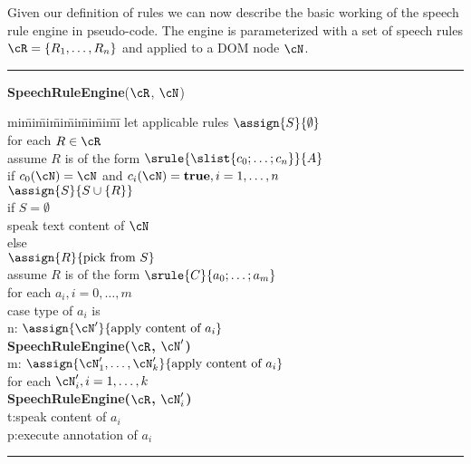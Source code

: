 \documentclass{sig-alternate}
\begin{document}
Given our definition of rules we can now describe the basic working of the
speech rule engine in pseudo-code. The engine is parameterized with a set of
speech rules ${\cR}={\{R_1,\ldots,R_n\}}$ and applied to a DOM node $\cN$.

\vspace{.3cm}\hrule\vspace{.2cm}
\noindent \textbf{SpeechRuleEngine}($\cR$, $\cN$)
\vspace{-.2cm}\begin{ntabbing}
  mi\=mi\=mi\=mi\=mi\=mi\=mi\=mi\=\kill
  let applicable rules $\assign{S}{\emptyset}$\label{}\\
  for each $R\in \cR$\label{}\\
  \> assume $R$ is of the form $\srule{\slist{c_0;\ldots;c_n}}{A}$\label{}\\
  \> if $c_0(\cN) = \cN$ and $c_i(\cN) = \mathbf{true}, i=1,\ldots,n$\label{}\\
  \>\> $\assign{S}{S\cup\{R\}}$\label{}\\
  if $S=\emptyset$\label{}\\
  \> speak text content of $\cN$\label{line:default}\\
  else \label{}\\
  \> $\assign{R}{\mbox{pick from }S}$ \label{line:heuristic}\\
  \> assume $R$ is of the form $\srule{C}{a_0;\ldots;a_m}$\label{}\\
  \> for each $a_i, i=0,\ldots,m$\label{}\\
  \>\>case type of $a_i$ is\label{}\\
  \>\>\>n:\> $\assign{\cN'}{\mbox{apply content of } a_i}$\label{line:case-n}\\
  \>\>\>\>\textbf{SpeechRuleEngine($\cR$, $\cN'$)}\label{}\\
  \>\>\>m:\> $\assign{\cN_1',\ldots,\cN_k'}{\mbox{apply content of } a_i}$\label{line:case-m}\\
  \>\>\>\>for each $\cN_i', i=1,\ldots,k$\label{}\\
  \>\>\>\>\>\textbf{SpeechRuleEngine($\cR$, $\cN_i'$)}\label{}\\
  \>\>\>t:\>speak content of $a_i$\label{line:case-t}\\
  \>\>\>p:\>execute annotation of $a_i$\label{line:case-p}\\
\end{ntabbing}
\vspace{-.5cm}\hrule\vspace{.2cm} 
\end{document}
